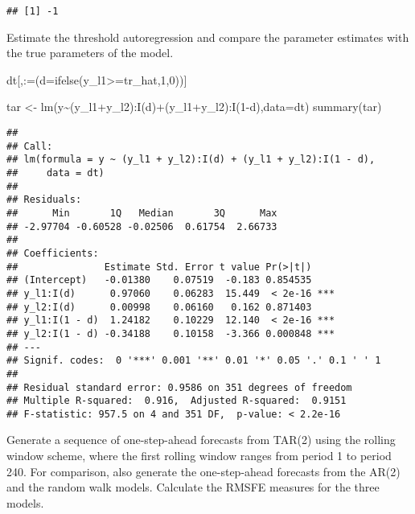 \documentclass[
  oneside]{book}
\newenvironment{Shaded}{\begin{snugshade}}{\end{snugshade}}
\newcommand{\AttributeTok}[1]{\textcolor[rgb]{0.77,0.63,0.00}{#1}}
\newcommand{\DecValTok}[1]{\textcolor[rgb]{0.00,0.00,0.81}{#1}}
\newcommand{\FunctionTok}[1]{\textcolor[rgb]{0.00,0.00,0.00}{#1}}
\newcommand{\NormalTok}[1]{#1}
\newcommand{\OtherTok}[1]{\textcolor[rgb]{0.56,0.35,0.01}{#1}}
\newcommand{\SpecialCharTok}[1]{\textcolor[rgb]{0.00,0.00,0.00}{#1}}
\newcommand{\StringTok}[1]{\textcolor[rgb]{0.31,0.60,0.02}{#1}}
\begin{document}
\begin{verbatim}
## [1] -1
\end{verbatim}

Estimate the threshold autoregression and compare the parameter estimates with the true parameters of the model.

\begin{Shaded}
\begin{Highlighting}[]
\NormalTok{dt[,}\StringTok{\textasciigrave{}}\AttributeTok{:=}\StringTok{\textasciigrave{}}\NormalTok{(}\AttributeTok{d=}\FunctionTok{ifelse}\NormalTok{(y\_l1}\SpecialCharTok{\textgreater{}=}\NormalTok{tr\_hat,}\DecValTok{1}\NormalTok{,}\DecValTok{0}\NormalTok{))]}

\NormalTok{tar }\OtherTok{\textless{}{-}} \FunctionTok{lm}\NormalTok{(y}\SpecialCharTok{\textasciitilde{}}\NormalTok{(y\_l1}\SpecialCharTok{+}\NormalTok{y\_l2)}\SpecialCharTok{:}\FunctionTok{I}\NormalTok{(d)}\SpecialCharTok{+}\NormalTok{(y\_l1}\SpecialCharTok{+}\NormalTok{y\_l2)}\SpecialCharTok{:}\FunctionTok{I}\NormalTok{(}\DecValTok{1}\SpecialCharTok{{-}}\NormalTok{d),}\AttributeTok{data=}\NormalTok{dt)}
\FunctionTok{summary}\NormalTok{(tar)}
\end{Highlighting}
\end{Shaded}

\begin{verbatim}
## 
## Call:
## lm(formula = y ~ (y_l1 + y_l2):I(d) + (y_l1 + y_l2):I(1 - d), 
##     data = dt)
## 
## Residuals:
##      Min       1Q   Median       3Q      Max 
## -2.97704 -0.60528 -0.02506  0.61754  2.66733 
## 
## Coefficients:
##               Estimate Std. Error t value Pr(>|t|)    
## (Intercept)   -0.01380    0.07519  -0.183 0.854535    
## y_l1:I(d)      0.97060    0.06283  15.449  < 2e-16 ***
## y_l2:I(d)      0.00998    0.06160   0.162 0.871403    
## y_l1:I(1 - d)  1.24182    0.10229  12.140  < 2e-16 ***
## y_l2:I(1 - d) -0.34188    0.10158  -3.366 0.000848 ***
## ---
## Signif. codes:  0 '***' 0.001 '**' 0.01 '*' 0.05 '.' 0.1 ' ' 1
## 
## Residual standard error: 0.9586 on 351 degrees of freedom
## Multiple R-squared:  0.916,  Adjusted R-squared:  0.9151 
## F-statistic: 957.5 on 4 and 351 DF,  p-value: < 2.2e-16
\end{verbatim}

Generate a sequence of one-step-ahead forecasts from TAR(2) using the rolling window scheme, where the first rolling window ranges from period 1 to period 240. For comparison, also generate the one-step-ahead forecasts from the AR(2) and the random walk models. Calculate the RMSFE measures for the three models.
\end{document}
